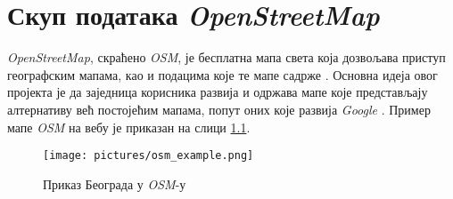 \documentclass[12pt,oneside]{memoir}
\begin{document}
\begin{comment}
Наравно, Спаркл језик је доста мођнији од једноставног примера који је приказан, али улазак у детаље је ван опсега овог рада.


\subsection{Употреба семантичког веба}
\label{subsec:semantic_end}

Семантички веб је и даље млада технологија која се развија, и тренутно се налази у фази између примене и развоја, али има велики потенцијал и може имати велики број примена. У последње време неке веб странице и портали почињу да користе \textit{RDF} и метаподатке и на тај начин постају део уланчаних података (енг. \textit{linked data}). У последње време се појављују и семантичке википедије, које су сличне као и већ постојеће, с тим што омогућавају кориснику да мења метаподатке који допуњује странице. Поред њих се развијају и семантички портали, веб странице где поред информација доступних човеку, постоје и друге, онтолошке, намењене машинама. Те информације се користе у циљу побољшања искуства корисника који користе те портале. \cite{semantic}


\end{comment} %

\chapter{Скуп података \textit{OpenStreetMap}}
\label{chp:osm}

\textit{OpenStreetMap}, скраћено \textit{OSM}, је бесплатна мапа света која дозвољава приступ географским мапама, као и подацима које те мапе садрже \cite{osm_wiki}. Основна идеја овог пројекта је да заједница корисника развија и одржава мапе које представљају алтернативу већ постојећим мапама, попут оних које развија \textit{Google} \cite{google_maps}. Пример мапе \textit{OSM} на вебу је приказан на слици \ref{fig:osm_map_example}.

\begin{figure}[!ht]
  \centering
  \texttt{[image: pictures/osm\_example.png]}
  \caption{Приказ Београда у \textit{OSM}-у}
  \label{fig:osm_map_example}
\end{figure}
\end{document}
